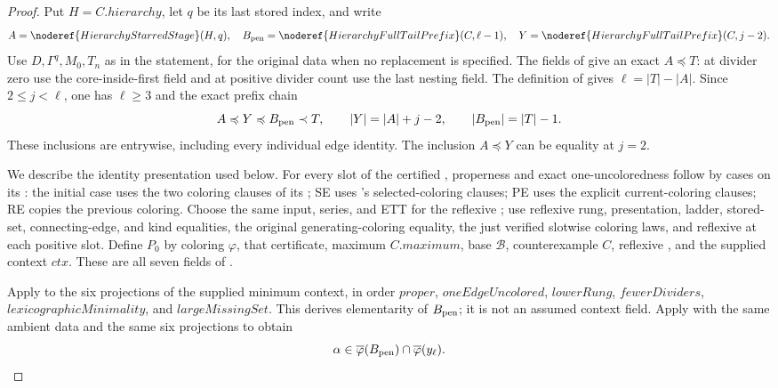 \begin{proof}
Put $H=C.\mathit{hierarchy}$, let $q$ be its last stored index, and write
\[
 A=\noderef{HierarchyStarredStage}(H,q),\quad
 B_{\rm pen}=\noderef{HierarchyFullTailPrefix}(C,\ell-1),\quad
 Y=\noderef{HierarchyFullTailPrefix}(C,j-2).
\]
Use $D,\Gamma^q,M_0,T_n$ as in the statement, for the original data
when no replacement is specified. The fields of
 give an exact
 $A\preccurlyeq T$:
at divider zero use the core-inside-first field and at positive divider
count use the last nesting field. The definition of
 gives $\ell=|T|-|A|$.
Since $2\le j<\ell$, one has $\ell\ge3$ and the exact prefix chain
\[
 A\preccurlyeq Y\preccurlyeq B_{\rm pen}\prec T,\qquad
 |Y|=|A|+j-2,\qquad |B_{\rm pen}|=|T|-1.
\]
These inclusions are entrywise, including every individual edge identity.
The inclusion $A\preccurlyeq Y$ can be equality at $j=2$.

We describe the identity presentation used below. For every slot of
the certified , properness and exact
one-uncoloredness follow by cases on its
: the initial case uses the two coloring
clauses of its ; SE uses
's selected-coloring clauses; PE uses
the explicit current-coloring clauses; RE copies the previous coloring.
Choose the same input, series, and ETT for the reflexive
; use reflexive rung,
presentation, ladder, stored-set, connecting-edge, and kind equalities,
the original generating-coloring equality, the just verified slotwise
coloring laws, and reflexive  at each positive
slot. Define $P_0$ by coloring $\varphi$, that certificate, maximum
$C.\mathit{maximum}$, base $\mathcal B$, counterexample $C$, reflexive
, and the supplied context $\mathit{ctx}$.
These are all seven fields of
.

Apply  to
the six projections of the supplied minimum context, in order
$\mathit{proper}$, $\mathit{oneEdgeUncolored}$, $\mathit{lowerRung}$,
$\mathit{fewerDividers}$, $\mathit{lexicographicMinimality}$, and
$\mathit{largeMissingSet}$. This derives elementarity of $B_{\rm pen}$;
it is not an assumed context field.
Apply  with
the same ambient data and the same six projections to obtain
\[
 \alpha\in\overline\varphi(B_{\rm pen})\cap\overline\varphi(y_\ell).
\]


\end{proof}
